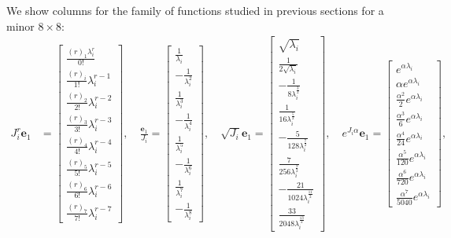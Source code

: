 We show columns for the family of functions studied in previous sections
for a minor $8\times8$:
\begin{displaymath}
\begin{split}
J_{i}^{r} \boldsymbol{e}_{1} &= \left[\begin{matrix}\frac{{\left(r\right)}_{1} \lambda_{i}^{r}}{0!}\\\frac{{\left(r\right)}_{i}}{1!} \lambda_{i}^{r - 1}\\\frac{{\left(r\right)}_{2}}{2!} \lambda_{i}^{r - 2}\\\frac{{\left(r\right)}_{3}}{3!} \lambda_{i}^{r - 3}\\\frac{{\left(r\right)}_{4}}{4!} \lambda_{i}^{r - 4}\\\frac{{\left(r\right)}_{5}}{5!} \lambda_{i}^{r - 5}\\\frac{{\left(r\right)}_{6}}{6!} \lambda_{i}^{r - 6}\\\frac{{\left(r\right)}_{7}}{7!} \lambda_{i}^{r - 7}\end{matrix}\right],\quad
\frac{\boldsymbol{e}_{1}}{J_{i}} = \left[\begin{matrix}\frac{1}{\lambda_{i}}\\- \frac{1}{\lambda_{i}^{2}}\\\frac{1}{\lambda_{i}^{3}}\\- \frac{1}{\lambda_{i}^{4}}\\\frac{1}{\lambda_{i}^{5}}\\- \frac{1}{\lambda_{i}^{6}}\\\frac{1}{\lambda_{i}^{7}}\\- \frac{1}{\lambda_{i}^{8}}\end{matrix}\right],\quad
\sqrt{J_{i}} \boldsymbol{e}_{1} = \left[\begin{matrix}\sqrt{\lambda_{i}}\\\frac{1}{2 \sqrt{\lambda_{i}}}\\- \frac{1}{8 \lambda_{i}^{\frac{3}{2}}}\\\frac{1}{16 \lambda_{i}^{\frac{5}{2}}}\\- \frac{5}{128 \lambda_{i}^{\frac{7}{2}}}\\\frac{7}{256 \lambda_{i}^{\frac{9}{2}}}\\- \frac{21}{1024 \lambda_{i}^{\frac{11}{2}}}\\\frac{33}{2048 \lambda_{i}^{\frac{13}{2}}}\end{matrix}\right], \quad
e^{J_{i} \alpha} \boldsymbol{e}_{1} = \left[\begin{matrix}e^{\alpha \lambda_{i}}\\\alpha e^{\alpha \lambda_{i}}\\\frac{\alpha^{2}}{2} e^{\alpha \lambda_{i}}\\\frac{\alpha^{3}}{6} e^{\alpha \lambda_{i}}\\\frac{\alpha^{4}}{24} e^{\alpha \lambda_{i}}\\\frac{\alpha^{5}}{120} e^{\alpha \lambda_{i}}\\\frac{\alpha^{6}}{720} e^{\alpha \lambda_{i}}\\\frac{\alpha^{7}}{5040} e^{\alpha \lambda_{i}}\end{matrix}\right], \\

\end{split}
\end{displaymath}
